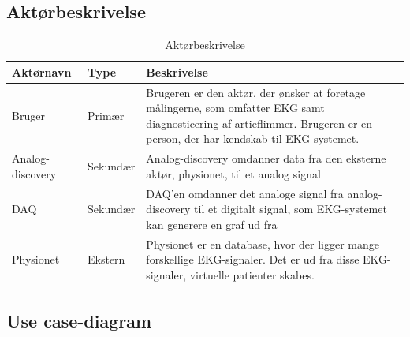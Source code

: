 \subsection{Aktørbeskrivelse}

\begin{table}[H]
\begin{tabularx}{\textwidth}{l l X}
     Aktørnavn  & Type      & Beskrivelse \\ \midrule
     Bruger   & Primær    & Brugeren er den aktør, der ønsker at foretage målingerne, som omfatter EKG samt diagnosticering af artieflimmer. Brugeren er en person, der har kendskab til EKG-systemet. \\ 						  									  \addlinespace[2mm]
     Analog-discovery & Sekundær  & Analog-discovery omdanner data fra den eksterne aktør, physionet, til et analog signal \\ 
     	\addlinespace[2mm]
     DAQ & Sekundær  & DAQ'en omdanner det analoge signal fra analog-discovery til et digitalt signal, som EKG-systemet kan generere en graf ud fra  \\ 
     	\addlinespace[2mm]
     Physionet & Ekstern 	& Physionet er en database, hvor der ligger mange forskellige EKG-signaler. Det er ud fra disse EKG-signaler, virtuelle patienter skabes.\\	                                                                                                                                                                           
   
     \bottomrule                                                                                                                   
    \end{tabularx}
    \caption {Aktørbeskrivelse}
    \label{tab:aktoerbeskrivelse}
	
\end{table}

\subsection{Use case-diagram}

